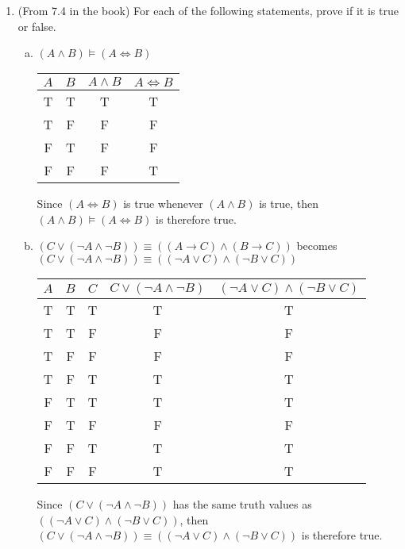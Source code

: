 \documentclass[10pt,draftclsnofoot,onecolumn]{IEEEtran}
\begin{document}
\begin{enumerate}
  \item (From 7.4 in the book) For each of the following statements, prove if it is true or false.
  \begin{enumerate}[a)]
    \item \( (A \land B) \models (A \iff B) \) \\

    \begin{tabular}{|c|c|c|c|}
      \hline
      \( A \) & \( B \) & \( A \land B \) & \( A \iff B \) \\
      \hline
      T & T & T & T \\
      T & F & F & F \\
      F & T & F & F \\
      F & F & F & T \\
      \hline
    \end{tabular} \medskip %

    Since \( (A \iff B) \) is true whenever \( (A \land B) \) is true, then \( (A \land B) \models (A \iff B) \) is therefore true. \\

    \item \( (C \lor (\neg A \land \neg B)) \equiv ((A \rightarrow C) \land (B \rightarrow C)) \) becomes \( (C \lor (\neg A \land \neg B)) \equiv ((\neg A \lor C) \land (\neg B \lor C)) \) \\

    \begin{tabular}{|c|c|c|c|c|}
      \hline
      \( A \) & \( B \) & \( C \) & \( C \lor (\neg A \land \neg B) \) & \( (\neg A \lor C) \land (\neg B \lor C) \) \\
      \hline
      T & T & T & T & T \\
      T & T & F & F & F \\
      T & F & F & F & F \\
      T & F & T & T & T \\
      F & T & T & T & T \\
      F & T & F & F & F \\
      F & F & T & T & T \\
      F & F & F & T & T \\
      \hline
    \end{tabular} \medskip %

    Since \( (C \lor (\neg A \land \neg B)) \) has the same truth values as \( ((\neg A \lor C) \land (\neg B \lor C)) \), then \( (C \lor (\neg A \land \neg B)) \equiv ((\neg A \lor C) \land (\neg B \lor C)) \) is therefore true. \\


\end{enumerate}
\end{enumerate}
\end{document}
